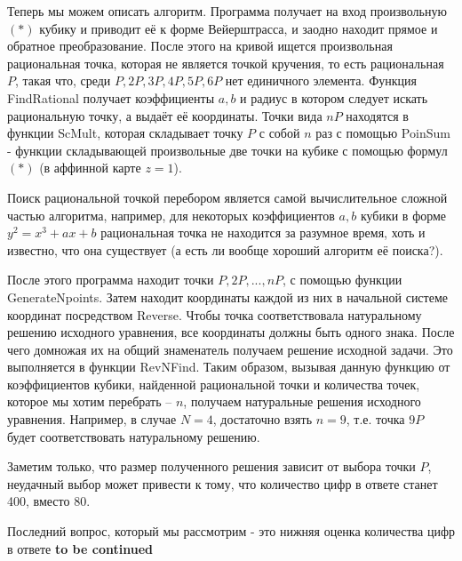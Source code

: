 Теперь мы можем описать алгоритм. Программа получает на вход произвольную
\((*)\) кубику и приводит её к форме Вейерштрасса, и заодно находит прямое и
обратное преобразование. После этого на кривой ищется произвольная
рациональная точка, которая не является точкой кручения, то есть  рациональная
\(P\), такая что, среди \(P, 2P, 3P, 4P, 5P, 6P\) нет единичного элемента.
Функция \textsf{FindRational} получает коэффициенты \(a, b\) и радиус в
котором следует искать рациональную точку,  а выдаёт её координаты. Точки вида
\(nP\) находятся в функции \textsf{ScMult}, которая складывает точку \(P\) с
собой \(n\) раз с помощью \textsf{PoinSum} - функции складывающей произвольные
две точки на кубике с помощью формул  \((*)\) (в аффинной карте \(z = 1\)). 

\begin{remark*}
    Поиск рациональной точкой перебором является самой вычислительное
    сложной частью алгоритма, например, для некоторых коэффициентов \(a, b\) кубики в
    форме \(y^2 = x^3 + ax + b\) рациональная точка не находится за разумное
    время, хоть и известно, что она существует (а есть ли вообще хороший алгоритм 
    её поиска?). 
\end{remark*}

После этого программа находит точки \(P, 2P, ... , nP\), с помощью функции
\textsf{GenerateNpoints}. Затем находит координаты каждой из них в начальной системе
координат посредством Reverse. Чтобы точка соответствовала натуральному
решению исходного уравнения, все координаты должны быть одного знака. После
чего домножая их на общий знаменатель получаем решение исходной задачи. Это
выполняется в функции \textsf{RevNFind}. Таким образом, вызывая данную функцию от
коэффициентов кубики, найденной рациональной точки и  количества точек,
которое мы хотим перебрать -- \(n\), получаем натуральные решения исходного
уравнения. Например, в случае \(N = 4\), достаточно взять \(n = 9\), т.е.
точка \(9P\) будет соответствовать натуральному решению.
 
Заметим только, что размер полученного решения зависит от выбора точки \(P\),
неудачный выбор может привести к тому, что количество цифр в ответе станет
400, вместо 80.

Последний вопрос, который мы рассмотрим - это нижняя оценка количества цифр в
ответе \textbf{to be continued}

